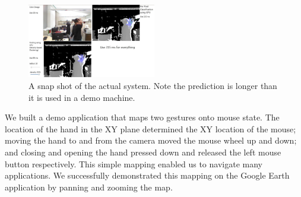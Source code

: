 \begin{figure}
\centering
	\includegraphics[width=0.5\textwidth]{fig/System.jpg}
	\caption{A snap shot of the actual system. Note the prediction is longer than it is used in a demo machine.}
\label{fig: system}
\end{figure}

We built a demo application that maps two gestures onto mouse state. The location of the hand in the XY plane determined the XY location of the mouse; moving the hand to and from the camera moved the mouse wheel up and down; and closing and opening the hand pressed down and released the left mouse button respectively. This simple mapping enabled us to navigate many applications. We successfully demonstrated this mapping on the Google Earth application \cite{googleearth} by panning and zooming the map.
